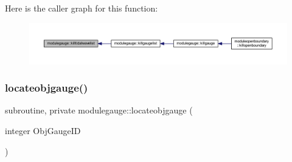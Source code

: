 Here is the caller graph for this function\+:\nopagebreak
\begin{figure}[H]
\begin{center}
\leavevmode
\includegraphics[width=350pt]{namespacemodulegauge_acb5358a89d47698a9abd5cea060b0cc8_icgraph}
\end{center}
\end{figure}
\mbox{\label{namespacemodulegauge_ad450a5738058992462096cd7d19b5a94}} 
\subsubsection{\texorpdfstring{locateobjgauge()}{locateobjgauge()}}
{\footnotesize\ttfamily subroutine, private modulegauge\+::locateobjgauge (\begin{DoxyParamCaption}\item[{integer}]{Obj\+Gauge\+ID }\end{DoxyParamCaption})\hspace{0.3cm}{\ttfamily [private]}}

